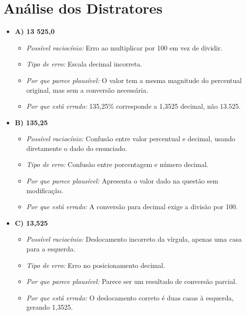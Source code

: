 \documentclass{article}
\begin{document}
\section{Análise dos Distratores}

\begin{itemize}

  \item \textbf{A) 13 525,0}
    \begin{itemize}
      \item \textit{Possível raciocínio:} Erro ao multiplicar por 100 em vez de dividir.
      \item \textit{Tipo de erro:} Escala decimal incorreta.
      \item \textit{Por que parece plausível:} O valor tem a mesma magnitude do percentual original, mas sem a conversão necessária.
      \item \textit{Por que está errado:} 135,25\% corresponde a 1,3525 decimal, não 13.525.
    \end{itemize}

  \item \textbf{B) 135,25}
    \begin{itemize}
      \item \textit{Possível raciocínio:} Confusão entre valor percentual e decimal, usando diretamente o dado do enunciado.
      \item \textit{Tipo de erro:} Confusão entre porcentagem e número decimal.
      \item \textit{Por que parece plausível:} Apresenta o valor dado na questão sem modificação.
      \item \textit{Por que está errado:} A conversão para decimal exige a divisão por 100.
    \end{itemize}

  \item \textbf{C) 13,525}
    \begin{itemize}
      \item \textit{Possível raciocínio:} Deslocamento incorreto da vírgula, apenas uma casa para a esquerda.
      \item \textit{Tipo de erro:} Erro no posicionamento decimal.
      \item \textit{Por que parece plausível:} Parece ser um resultado de conversão parcial.
      \item \textit{Por que está errado:} O deslocamento correto é duas casas à esquerda, gerando 1,3525.
    \end{itemize}


\end{itemize}
\end{document}
